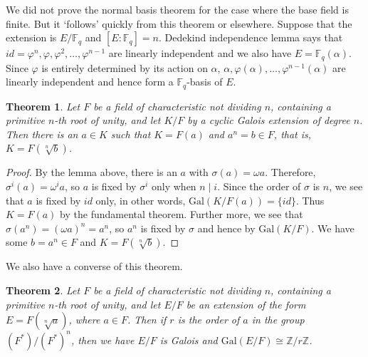 \documentclass[12pt]{report}
\newtheorem{theorem}{Theorem}[section]
\theoremstyle{definition}
\newcommand{\ff}{\mathbb{F}}
\newcommand{\Gal}{\text{Gal}}
\newcommand{\ZZ}{\mathbb{Z}}
\begin{document}
\begin{remark}
	We did not prove the normal basis theorem for the case where the base field is finite. But it `follows' quickly from this theorem or elsewhere. Suppose that the extension is $E/\ff_q$ and $[ E:\ff_q ]=n$. Dedekind independence lemma says that $id=\varphi^n,\varphi,\varphi^2,\dots,\varphi^{n-1}$ are linearly independent and we also have $E=\ff_q(\alpha)$. Since $\varphi$ is entirely determined by its action on $\alpha$, $\alpha,\varphi(\alpha),\dots,\varphi^{n-1}(\alpha)$ are linearly independent and hence form a $\ff_q$-basis of $E$.
\end{remark}

\begin{theorem}\label{cyclicgal1}
	Let $F$ be a field  of characteristic not dividing $n$, containing a primitive $n$-th root of unity, and let $K/F$ by a cyclic Galois extension of degree $n$. Then there is an $a\in K$ such that $K=F(a)$ and $a^n=b\in F$, that is, $K=F(\sqrt[n]{b})$.
\end{theorem}

\begin{proof}
	By the lemma above, there is an $a$ with $\sigma(a)=\omega a$. Therefore, $\sigma^i(a)=\omega^ia$, so $a$ is fixed by $\sigma^i$ only when $n\mid i$. Since the order of $\sigma$ is $n$, we see that $a$ is fixed by $id$ only, in other words, $\Gal(K/F(a))=\{id\}$. Thus $K=F(a)$ by the fundamental theorem. Further more, we see that $\sigma(a^n)=(\omega a)^n=a^n$, so $a^n$ is fixed by $\sigma$ and hence by $\Gal(K/F)$. We have some $b=a^n\in F$ and $K=F(\sqrt[n]{b})$.
\end{proof}

We also have a converse of this theorem.

\begin{theorem}
	Let $F$ be a field of characteristic not dividing $n$, containing a primitive $n$-th root of unity, and let $E/F$ be an extension of the form $E=F(\sqrt[n]{a})$, where $a\in F$. Then if $r$ is the order of $a$ in the group $(F^*)/(F^*)^n$, then we have $E/F$ is Galois and $\Gal(E/F)\cong \ZZ/r\ZZ$.
\end{theorem}
\end{document}
